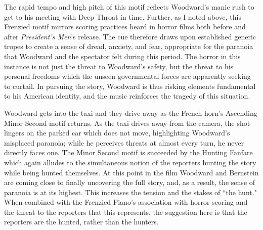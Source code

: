 The rapid tempo and  high pitch of this motif reflects Woodward's manic rush to get to his meeting with Deep Throat in time.
Further, as I noted above, this Frenzied motif mirrors scoring practices heard in horror films both before and after \textit{President's Men}'s release.
The cue therefore draws upon established generic tropes to create a sense of dread, anxiety, and fear, appropriate for the paranoia that Woodward and the spectator felt during this period.
The horror in this instance is not just the threat to Woodward's safety, but the threat to his personal freedoms which the unseen governmental forces are apparently seeking to curtail.
In pursuing the story, Woodward is thus risking elements fundamental to his American identity, and the music reinforces the tragedy of this situation.

Woodward gets into the taxi and they drive away as the French horn's Ascending Minor Second motif returns.
As the taxi drives away from the camera, the shot lingers on the parked car which does not move, highlighting Woodward's misplaced paranoia; while he perceives threats at almost every turn, he never directly faces one.
The Minor Second motif is succeeded by the Hunting Fanfare which again alludes to the simultaneous notion of the reporters hunting the story while being hunted themselves.
At this point in the film Woodward and Bernstein are coming close to finally uncovering the full story, and, as a result, the sense of paranoia is at its highest.
This increases the tension and the stakes of ``the hunt."
When combined with the Frenzied Piano's association with horror scoring and the threat to the reporters that this represents, the suggestion here is that the reporters are the hunted, rather than the hunters.

